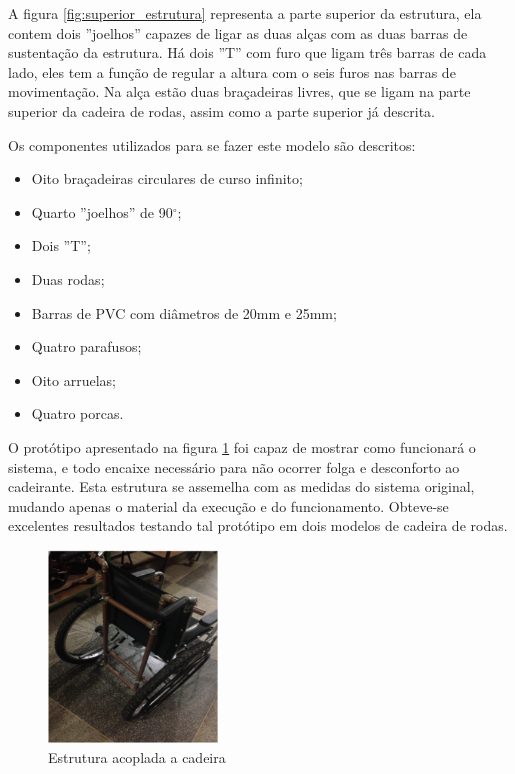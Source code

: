 A figura \ref{fig:superior_estrutura} representa a parte superior da estrutura, ela contem dois ''joelhos'' capazes de ligar as duas alças com as duas barras de sustentação da estrutura. Há dois ''T'' com furo que ligam três barras de cada lado, eles tem a função de regular a altura com o seis furos nas barras de movimentação. Na alça estão duas braçadeiras livres, que se ligam na parte superior da cadeira de rodas, assim como a parte superior já descrita.

Os componentes utilizados para se fazer este modelo são descritos:
\begin{itemize}
  \item Oito braçadeiras circulares de curso infinito;
  \item Quarto ''joelhos'' de 90$^\circ$;
  \item Dois ''T'';
  \item Duas rodas;
  \item Barras de PVC com diâmetros de 20mm e 25mm;
  \item Quatro parafusos;
  \item Oito arruelas;
  \item Quatro porcas.
\end{itemize}

O protótipo apresentado na figura \ref{fig:estr_prototipo} foi capaz de mostrar como funcionará o sistema, e todo encaixe necessário para não ocorrer folga e desconforto ao cadeirante. Esta estrutura se assemelha com as medidas do sistema original, mudando apenas o material da execução e do funcionamento. Obteve-se excelentes resultados testando tal protótipo em dois modelos de cadeira de rodas.

\begin{figure}[!htb]
\centering
\includegraphics[width=0.4\textwidth]{figuras/resultados/estr_prototipo}
\caption{Estrutura acoplada a cadeira}
\label{fig:estr_prototipo}
\end{figure}

